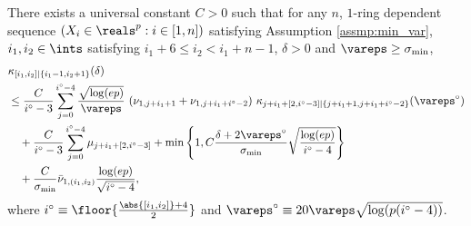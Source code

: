 \documentclass[aos]{imsart}
\begin{document}
\begin{appendix}
\begin{lemma} %
\label{thm:induction_lemma_AC_P}
    There exists a universal constant $C > 0$ such that for any $n$, $1$-ring dependent sequence $(X_i \in \reals^p: i \in [1,n])$ satisfying Assumption \eqref{assmp:min_var}, $i_1, i_2 \in \ints$ satisfying $i_1+6 \leq i_2 < i_1+n-1$, $\delta > 0$ and $\vareps \geq \sigma_{\min}$,
    \begin{equation*} %
    \begin{aligned}
        & \kappa_{[i_1, i_2]|\{i_1-1, i_2+1\}}(\delta) \\
        & \leq \frac{C}{i^\circ-3} \sum_{j=0}^{i^\circ-4} 
        \frac{\sqrt{\log(ep)}}{\vareps} 
        ~ (\nu_{1,j+i_1+1} + \nu_{1,j+i_1+i^\circ-2}) 
        ~ \kappa_{j+i_1+[2,i^\circ-3]|\{j+i_1+1, j+i_1+i^\circ-2\}}(\vareps^\circ)\\
        & \quad + \frac{C}{i^\circ-3} \sum_{j=0}^{i^\circ-4} \mu_{j+i_1+[2,i^\circ-3]} 
        + \min\left\{1, C\frac{\delta + 2\vareps^\circ}{\sigma_{\min}} \sqrt{\frac{\log(ep)}{i^\circ-4}} \right\} \\
        & \quad + \frac{C}{\sigma_{\min}} \bar{\nu}_{1,(i_1,i_2)} \frac{\log(ep)}{\sqrt{i^\circ-4}},
    \end{aligned}
    \end{equation*}
    where $i^\circ \equiv \floor{\frac{\abs{[i_1,i_2]}+4}{2}}$ and $\vareps^\circ \equiv 20\vareps \sqrt{\log(p(i^\circ-4))}$. 
\end{lemma}








\end{appendix}
\end{document}
